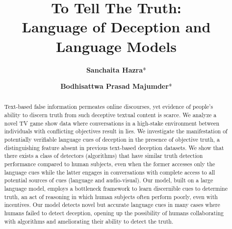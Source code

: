 \documentclass[11pt]{article}
\title{To Tell The Truth:\\Language of Deception and Language Models}
\author[$1$]{\textbf{Sanchaita Hazra}*}
\author[$2$]{\textbf{Bodhisattwa Prasad Majumder}*}
\affil[$1$]{University of Utah}
\affil[$2$]{Allen Institute for AI \protect \\ \texttt{sanchaita.hazra@utah.edu, bodhisattwam@allenai.org} \protect \\
\small \texttt{*contributes equally}}
\begin{document}
\maketitle
\begin{abstract}
Text-based false information permeates online discourses, yet evidence of people's ability to discern truth from such deceptive textual content is scarce. We analyze a novel TV game show data where conversations in a high-stake environment between individuals with conflicting objectives result in lies. We investigate the manifestation of potentially verifiable language cues of deception in the presence of objective truth, a distinguishing feature absent in previous text-based deception datasets. We show that there exists a class of detectors (algorithms) that have similar truth detection performance compared to human subjects, even when the former accesses only the language cues while the latter engages in conversations with complete access to all potential sources of cues (language and audio-visual). Our model, built on a large language model, employs a bottleneck framework to learn discernible cues to determine truth, an act of reasoning in which human subjects often perform poorly, even with incentives. Our model detects novel but accurate language cues in many cases where humans failed to detect deception, opening up the possibility of humans collaborating with algorithms and ameliorating their ability to detect the truth.
\end{abstract}












\appendix



\end{document}
